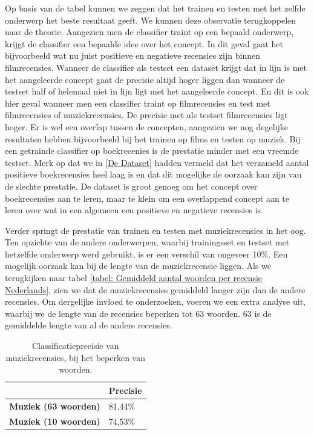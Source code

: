 Op basis van de tabel kunnen we zeggen dat het trainen en testen met het zelfde onderwerp het beste resultaat geeft. We kunnen deze observatie terugkoppelen naar de theorie. Aangezien men de classifier traint op een bepaald onderwerp, krijgt de classifier een bepaalde idee over het concept. In dit geval gaat het bijvoorbeeld wat nu juist positieve en negatieve recensies zijn binnen filmrecensies. Wanneer de classifier als testset een dataset krijgt dat in lijn is met het aangeleerde concept gaat de precisie altijd hoger liggen dan wanneer de testset half of helemaal niet in lijn ligt met het aangeleerde concept. En dit is ook hier geval wanneer men een classifier traint op filmrecensies en test met filmrecensies of muziekrecensies. De precisie met als testset filmrecensies ligt hoger. Er is wel een overlap tussen de concepten, aangezien we nog degelijke resultaten hebben bijvoorbeeld bij het trainen op films en testen op muziek. Bij een getrainde classifier op boekrecenies is de prestatie minder met een vreemde testset. Merk op dat we in \ref{De Dataset} hadden vermeld dat het verzameld aantal positieve boekrecensies heel laag is en dat dit mogelijke de oorzaak kan zijn van de slechte prestatie. De dataset is groot genoeg om het concept over boekrecensies aan te leren, maar te klein om een overlappend concept aan te leren over wat in een algemeen een positieve en negatieve recensies is.

Verder springt de prestatie van trainen en testen met muziekrecensies in het oog. Ten opzichte van de andere onderwerpen, waarbij trainingsset en testset met hetzelfde onderwerp werd gebruikt, is er een verschil van ongeveer 10\%. Een mogelijk oorzaak kan bij de lengte van de muziekrecensie liggen. Als we terugkijken naar tabel \ref{tabel: Gemiddeld aantal woorden per recensie Nederlands}, zien we dat de muziekrecensies gemiddeld langer zijn dan de andere recensies. Om dergelijke invloed te onderzoeken, voeren we een extra analyse uit, waarbij we de lengte van de recensies beperken tot 63 woorden. 63 is de gemiddelde lengte van al de andere recensies. \\

\begin{table}[h]
\centering
\begin{tabular}{l|l|}
\cline{2-2}
                                          & {\bf Precisie} \\ \hline
\multicolumn{1}{|l|}{{\bf Muziek (63 woorden)}} & 81,44\%        \\ \hline
\multicolumn{1}{|l|}{{\bf Muziek (10 woorden)}} & 74,53\%        \\ \hline
\end{tabular}
\caption{Classificatieprecisie van muziekrecensies, bij het beperken van woorden.}
\label{muziekrecensies beperking}
\end{table}

